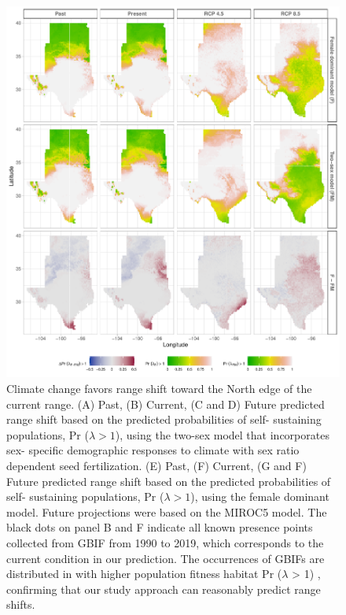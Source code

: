 \documentclass[12pt]{article}\usepackage[]{graphicx}\usepackage[dvipsnames]{xcolor}
\begin{document}
\begin{figure}[H]
  \begin{center}
    \includegraphics[width=0.95\linewidth]{Figures/Fig_geoPrlambda_miroc.pdf}
  \caption{Climate change favors range shift toward the North edge of the current range.
  (A) Past, (B) Current, (C and D) Future predicted range shift based on the predicted probabilities of self- sustaining populations, Pr ($\lambda > 1$), using the two-sex model that incorporates sex- specific demographic responses to climate with sex ratio dependent seed fertilization.
  (E) Past, (F) Current, (G and F) Future  predicted range shift based on the predicted probabilities of self- sustaining populations, Pr ($\lambda > 1$), using the female dominant model.
  Future projections were based on the MIROC5 model.
  The black dots on panel B and F indicate all known presence points collected from GBIF from 1990 to 2019, which corresponds to the current condition in our prediction. 
  The occurrences of GBIFs are distributed in with higher population fitness habitat Pr ($\lambda$ > 1) , confirming that our study approach can reasonably predict range shifts.}
  \label{Sup:geoprojmiroc}
  \end{center}
\end{figure}
\end{document}
